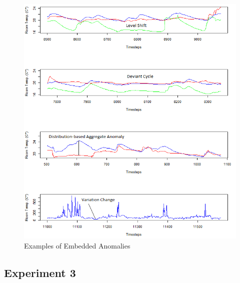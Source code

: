 \begin{figure}[h]
	\centering
	\includegraphics[scale=0.7]{Figures/temp_anomalies}
	\decoRule
	\caption[Temperature Dataset Anomalies]{Examples of Embedded Anomalies \parencite{Own}}
	\label{fig:temp_anomalies}
\end{figure}




\subsection{Experiment 3}
